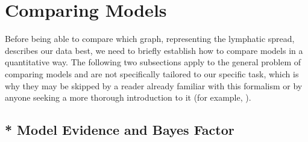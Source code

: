 \documentclass[\relativeRoot/main.tex]{subfiles}
\begin{document}
\section{Comparing Models}
\label{sec:graph:model_comp}

Before being able to compare which graph, representing the lymphatic spread, describes our data best, we need to briefly establish how to compare models in a quantitative way. The following two subsections apply to the general problem of comparing models and are not specifically tailored to our specific task, which is why they may be skipped by a reader already familiar with this formalism or by anyone seeking a more thorough introduction to it (for example, ).

\subsection{* Model Evidence and Bayes Factor}
\label{subsec:graph:model_comp:evidence}
\end{document}

